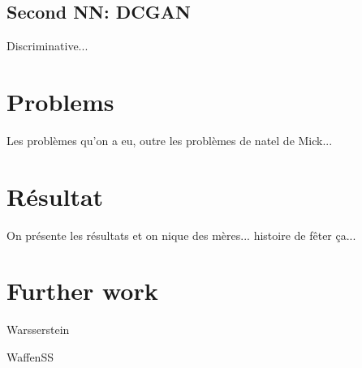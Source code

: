 \documentclass[
  10pt, 
  a4paper,
  oneside, 
  headinclude, 
  footinclude, 
  BCOR5mm, 
]{scrartcl}
\begin{document}
\subsection{Second NN: DCGAN}

Discriminative...


\section{Problems}

Les problèmes qu'on a eu, outre les problèmes de natel de Mick...


\section{Résultat}

On présente les résultats et on nique des mères... histoire de fêter ça...


\section{Further work}

Warsserstein

WaffenSS


\newpage

\tableofcontents
\listoffigures
\listoftables

\begin{thebibliography}{9}
\end{thebibliography}
\end{document}
